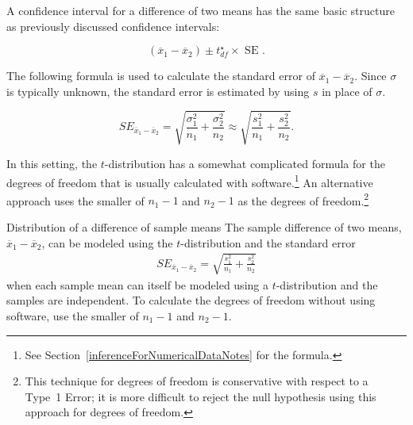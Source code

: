 
A confidence interval for a difference of two means has the same basic structure as previously discussed confidence intervals:

\[(\overline{x}_{1} - \overline{x}_{2}) \pm t^\star_{df} \times \text{ SE }. \]


The following formula is used to calculate the standard error of $\overline{x}_{1} - \overline{x}_{2}$. Since $\sigma$ is typically unknown, the standard error is estimated by using $s$ in place of $\sigma$. 

\[
SE_{\overline{x}_{1} - \overline{x}_{2}} = \sqrt{\frac{\sigma_{1}^2}{n_{1}} + \frac{\sigma_{2}^2}{n_{2}}} \approx \sqrt{\frac{s_{1}^2}{n_{1}} + \frac{s_{2}^2}{n_{2}}}.
\]

In this setting, the $t$-distribution has a somewhat complicated formula for the degrees of freedom that is usually calculated with software.\footnote{See Section~\ref{inferenceForNumericalDataNotes} for the formula.} An alternative approach uses the smaller of $n_1 - 1$ and $n_2 - 1$ as the degrees of freedom.\footnote{This technique for degrees of freedom is conservative with respect to a Type~1 Error; it is more difficult to reject the null hypothesis using this approach for degrees of freedom.}

\textD{\newpage}

\begin{onebox}{Distribution of a difference of sample means}
The sample difference of two means, $\overline{x}_1 - \overline{x}_2$, can be modeled using the $t$-distribution and the standard error
\begin{eqnarray}
\textstyle
SE_{\overline{x}_{1} - \overline{x}_{2}} = \sqrt{\frac{s_1^2}{n_1} + \frac{s_2^2}{n_2}}
\label{seOfDifferenceInMeans}
\end{eqnarray}
when each sample mean can itself be modeled using a $t$-distribution and the samples are independent. To calculate the degrees of freedom without using software, use the smaller of $n_1 - 1$ and $n_2 - 1$.
\end{onebox}

